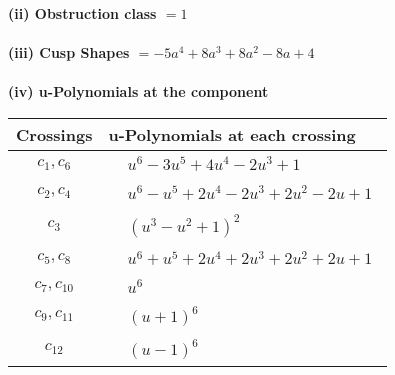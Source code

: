 \documentclass[1p]{elsarticle_modified}
\theoremstyle{definition}
\begin{document}
\flushleft \textbf{(ii) Obstruction class $= 1$}\\~\\
\flushleft \textbf{(iii) Cusp Shapes $= -5 a^4+8 a^3+8 a^2-8 a+4$}\\~\\
\newpage\renewcommand{\arraystretch}{1}
\flushleft \textbf{(iv) u-Polynomials at the component}\newline \\
\begin{tabular}{m{50pt}|m{274pt}}
Crossings & \hspace{64pt}u-Polynomials at each crossing \\
\hline $$\begin{aligned}c_{1},c_{6}\end{aligned}$$&$\begin{aligned}
&u^6-3 u^5+4 u^4-2 u^3+1
\end{aligned}$\\
\hline $$\begin{aligned}c_{2},c_{4}\end{aligned}$$&$\begin{aligned}
&u^6- u^5+2 u^4-2 u^3+2 u^2-2 u+1
\end{aligned}$\\
\hline $$\begin{aligned}c_{3}\end{aligned}$$&$\begin{aligned}
&(u^3- u^2+1)^2
\end{aligned}$\\
\hline $$\begin{aligned}c_{5},c_{8}\end{aligned}$$&$\begin{aligned}
&u^6+u^5+2 u^4+2 u^3+2 u^2+2 u+1
\end{aligned}$\\
\hline $$\begin{aligned}c_{7},c_{10}\end{aligned}$$&$\begin{aligned}
&u^6
\end{aligned}$\\
\hline $$\begin{aligned}c_{9},c_{11}\end{aligned}$$&$\begin{aligned}
&(u+1)^6
\end{aligned}$\\
\hline $$\begin{aligned}c_{12}\end{aligned}$$&$\begin{aligned}
&(u-1)^6
\end{aligned}$\\
\hline
\end{tabular}\\~\\
\end{document}
